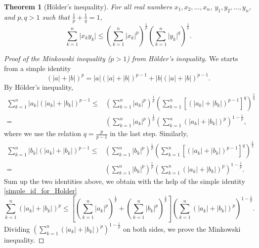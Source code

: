 \documentclass[a4paper,12pt]{article}
\newcommand{\Holder}{H\"{o}lder}
\newtheorem{thm}{Theorem}[section]
\theoremstyle{definition}
\theoremstyle{remark}
\begin{document}
\begin{thm}[\Holder's inequality]
  For all real numbers $x_1, x_2, \dotsc, x_n$, $y_1, y_2, \dotsc, y_n$, and $p, q > 1$ such that $\frac{1}{p} + \frac{1}{q} = 1$,
  \begin{equation*}
    \sum^n_{k=1} \lvert x_k y_k \rvert \leq \left( \sum^n_{k=1} \lvert x_k \rvert^p \right)^{\frac{1}{p}}  \left( \sum^n_{k=1} \lvert y_k \rvert^q \right)^{\frac{1}{q}}.
  \end{equation*}
\end{thm}
\begin{proof}[Proof of the Minkowski inequality ($p > 1$) from \Holder's inequality]
  We starts from a simple identity
  \begin{equation} \label{simple_id_for_Holder}
    (\lvert a \rvert + \lvert b \rvert)^p = \lvert a \rvert (\lvert a \rvert + \lvert b \rvert)^{p-1} + \lvert b \rvert (\lvert a \rvert + \lvert b \rvert)^{p-1}.
  \end{equation}
  By \Holder's inequality,
  \begin{equation*}
    \begin{split}
      \sum^n_{k=1} \lvert a_k \rvert (\lvert a_k \rvert + \lvert b_k \rvert)^{p-1} \leq {}& \left( \sum^n_{k=1} \lvert a_k \rvert^p \right)^{\frac{1}{p}} \left( \sum^n_{k=1} \left[ (\lvert a_k \rvert + \lvert b_k \rvert)^{p-1} \right]^q \right)^{\frac{1}{q}} \\
      = {}& \left( \sum^n_{k=1} \lvert a_k \rvert^p \right)^{\frac{1}{p}} \left( \sum^n_{k=1} (\lvert a_k \rvert + \lvert b_k \rvert)^p \right)^{1 - \frac{1}{p}},
    \end{split}
  \end{equation*}
  where we use the relation $q = \frac{p}{p-1}$ in the last step. Similarly,
  \begin{equation*}
    \begin{split}
      \sum^n_{k=1} \lvert b_k \rvert (\lvert a_k \rvert + \lvert b_k \rvert)^{p-1} \leq {}& \left( \sum^n_{k=1} \lvert b_k \rvert^p \right)^{\frac{1}{p}} \left( \sum^n_{k=1} \left[ (\lvert a_k \rvert + \lvert b_k \rvert)^{p-1} \right]^q \right)^{\frac{1}{q}} \\
      = {}& \left( \sum^n_{k=1} \lvert b_k \rvert^p \right)^{\frac{1}{p}} \left( \sum^n_{k=1} (\lvert a_k \rvert + \lvert b_k \rvert)^p \right)^{1 - \frac{1}{p}}.
    \end{split}
  \end{equation*}
Sum up the two identities above, we obtain with the help of the simple identity \eqref{simple_id_for_Holder}
\begin{equation*}
  \sum^n_{k=1} (\lvert a_k \rvert + \lvert b_k \rvert)^p \leq \left[ \left( \sum^n_{k=1} \lvert a_k \rvert^p \right)^{\frac{1}{p}} + \left( \sum^n_{k=1} \lvert b_k \rvert^p \right)^{\frac{1}{p}} \right] \left( \sum^n_{k=1} (\lvert a_k \rvert + \lvert b_k \rvert)^p \right)^{1 - \frac{1}{p}}.
\end{equation*}
Dividing $\left( \sum^n_{k=1} (\lvert a_k \rvert + \lvert b_k \rvert)^p \right)^{1 - \frac{1}{p}}$ on both sides, we prove the Minkowski inequality.
\end{proof}
\end{document}
